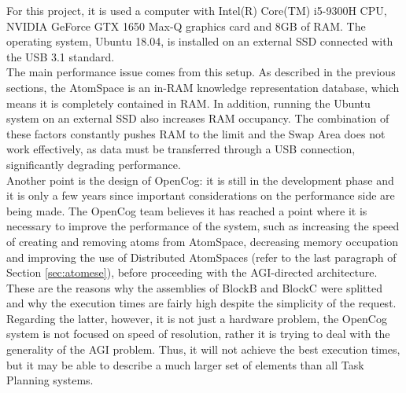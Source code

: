 For this project, it is used a computer with Intel(R) Core(TM) i5-9300H CPU, NVIDIA GeForce GTX 1650 Max-Q graphics card and 8GB of RAM. 
The operating system, Ubuntu 18.04, is installed on an external SSD connected with the USB 3.1 standard. \\
The main performance issue comes from this setup. As described in the previous sections, the AtomSpace is an in-RAM knowledge representation database, which means it is completely contained in RAM. In addition, running the Ubuntu system on an external SSD also increases RAM occupancy. 
The combination of these factors constantly pushes RAM to the limit and the Swap Area does not work effectively, as data must be transferred through a USB connection, significantly degrading performance. \\
Another point is the design of OpenCog: it is still in the development phase and it is only a few years since important considerations on the performance side are being made. 
The OpenCog team believes it has reached a point where it is necessary to improve the performance of the system, such as increasing the speed of creating and removing atoms from AtomSpace, decreasing memory occupation and improving the use of Distributed AtomSpaces (refer to the last paragraph of Section \ref{sec:atomese}), before proceeding with the AGI-directed architecture. \\
These are the reasons why the assemblies of BlockB and BlockC were splitted and why the execution times are fairly high despite the simplicity of the request.
Regarding the latter, however, it is not just a hardware problem, the OpenCog system is not focused on speed of resolution, rather it is trying to deal with the generality of the AGI problem. Thus, it will not achieve the best execution times, but it may be able to describe a much larger set of elements than all Task Planning systems.